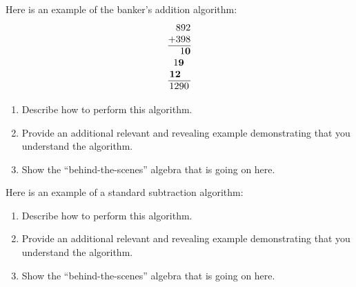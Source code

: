 \documentclass[nooutcomes]{ximera}
\begin{document}
\begin{problem}Here is an example of the banker's addition
  algorithm:
\[
\begin{array}{@{}r@{}}
892\\
+398\\ \hline
1\textbf{0}\\
1\textbf{9}~~\\
\textbf{12}~~~\\ \hline
1290\,
\end{array}
\]
\begin{enumerate}
\item Describe how to perform this algorithm.
\item Provide an additional relevant and revealing example
  demonstrating that you understand the algorithm.
\item Show the ``behind-the-scenes'' algebra that is going on here.
\end{enumerate}
\end{problem} 

\begin{problem}Here is an example of a standard subtraction
  algorithm:
\begin{image}
\end{image}
\begin{enumerate}
\item Describe how to perform this algorithm.
\item Provide an additional relevant and revealing example
  demonstrating that you understand the algorithm.
\item Show the ``behind-the-scenes'' algebra that is going on here.
\end{enumerate}
\end{problem} 
\end{document}
